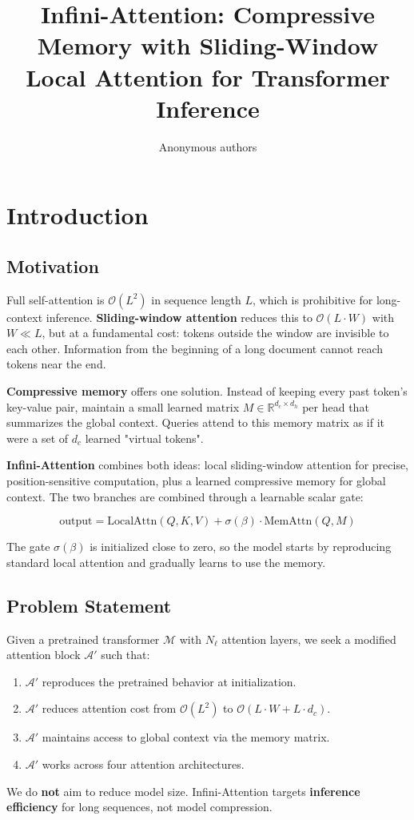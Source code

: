\title{\textbf{Infini-Attention: Compressive Memory with Sliding-Window Local Attention for Transformer Inference}}

\author{Anonymous authors}



\section{Introduction}

\subsection{Motivation}

Full self-attention is $\mathcal{O}(L^2)$ in sequence length $L$, which is 
prohibitive for long-context inference. \textbf{Sliding-window attention} reduces 
this to $\mathcal{O}(L \cdot W)$ with $W \ll L$, but at a fundamental cost: 
tokens outside the window are invisible to each other. Information from the 
beginning of a long document cannot reach tokens near the end.

\textbf{Compressive memory} offers one solution. Instead of keeping every past 
token's key-value pair, maintain a small learned matrix $M \in \mathbb{R}^{d_c \times d_h}$ 
per head that summarizes the global context. Queries attend to this memory 
matrix as if it were a set of $d_c$ learned "virtual tokens".

\textbf{Infini-Attention} combines both ideas: local sliding-window attention for 
precise, position-sensitive computation, plus a learned compressive memory 
for global context. The two branches are combined through a learnable scalar 
gate:

\[
\text{output} = \text{LocalAttn}(Q, K, V) + \sigma(\beta) \cdot \text{MemAttn}(Q, M)
\tag{1.1}
\]

The gate $\sigma(\beta)$ is initialized close to zero, so the model starts by 
reproducing standard local attention and gradually learns to use the memory.

\subsection{Problem Statement}

Given a pretrained transformer $\mathcal{M}$ with $N_\ell$ attention layers, 
we seek a modified attention block $\mathcal{A}'$ such that:

\begin{enumerate}
\item $\mathcal{A}'$ reproduces the pretrained behavior at initialization.
\item $\mathcal{A}'$ reduces attention cost from $\mathcal{O}(L^2)$ to
  $\mathcal{O}(L \cdot W + L \cdot d_c)$.
\item $\mathcal{A}'$ maintains access to global context via the memory matrix.
\item $\mathcal{A}'$ works across four attention architectures.

\end{enumerate}
We do \textbf{not} aim to reduce model size. Infini-Attention targets 
\textbf{inference efficiency} for long sequences, not model compression.

